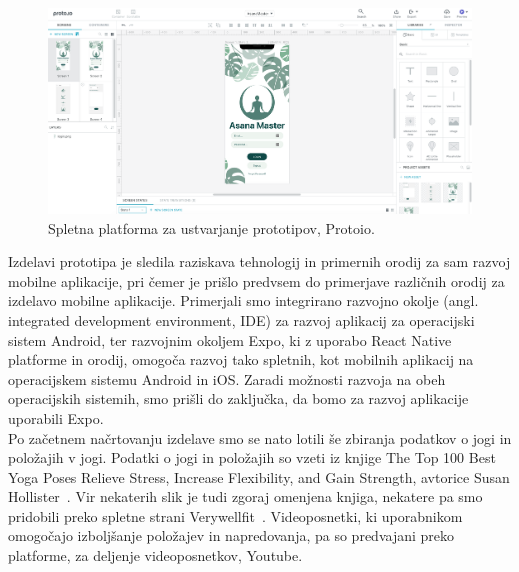 \documentclass[a4paper, 12pt]{book}
\begin{document}
\begin{figure}[htbp]
\begin{center}
\includegraphics[scale=.23]{protoio.jpg}
\end{center}
\caption{Spletna platforma za ustvarjanje prototipov, Protoio.}
\label{protoio}
\end{figure}

Izdelavi prototipa je sledila raziskava tehnologij in primernih orodij za sam razvoj mobilne aplikacije, pri čemer je prišlo predvsem do primerjave različnih orodij za izdelavo mobilne aplikacije. Primerjali smo integrirano razvojno okolje (angl. integrated development environment, IDE) za razvoj aplikacij za operacijski sistem Android, ter razvojnim okoljem Expo, ki z uporabo React Native platforme in orodij, omogoča razvoj tako spletnih, kot mobilnih aplikacij na operacijskem sistemu Android in iOS. Zaradi možnosti razvoja na obeh operacijskih sistemih, smo prišli do zaključka, da bomo za razvoj aplikacije uporabili Expo.\\

Po začetnem načrtovanju izdelave smo se nato lotili še zbiranja podatkov o jogi in položajih v jogi. Podatki o jogi in položajih so vzeti iz knjige The Top 100 Best Yoga Poses Relieve Stress, Increase Flexibility, and Gain Strength, avtorice Susan Hollister~\cite{yoga}. Vir nekaterih slik je tudi zgoraj omenjena knjiga, nekatere pa smo pridobili preko spletne strani Verywellfit~\cite{verywellfit}. Videoposnetki, ki uporabnikom omogočajo izboljšanje položajev in napredovanja, pa so predvajani preko platforme, za deljenje videoposnetkov, Youtube.
\end{document}
